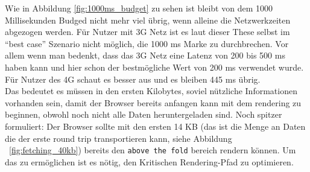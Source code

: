 		Wie in Abbildung \ref{fig:1000ms_budget} zu sehen ist bleibt von dem 1000 Millisekunden Budged nicht mehr viel übrig, wenn alleine die Netzwerkzeiten abgezogen werden. Für Nutzer mit 3G Netz ist es laut dieser These selbst im "`best case"' Szenario nicht möglich, die 1000 ms Marke zu durchbrechen. Vor allem wenn man bedenkt, dass das 3G Netz eine Latenz von 200 bis 500 ms haben kann und hier schon der bestmögliche Wert von 200 ms verwendet wurde.\\
		Für Nutzer des 4G schaut es besser aus und es bleiben 445 ms übrig.\\
		Das bedeutet es müssen in den ersten Kilobytes, soviel nützliche Informationen vorhanden sein, damit der Browser bereits anfangen kann mit dem rendering zu beginnen, obwohl noch nicht alle Daten heruntergeladen sind. Noch spitzer formuliert: Der Browser sollte mit den ersten 14 KB (das ist die Menge an Daten die der erste round trip transportieren kann, siehe Abbildung ~\ref{fig:fetching_40kb}) bereits den \texttt{above the fold} bereich rendern können. Um das zu ermöglichen ist es nötig, den Kritischen Rendering-Pfad zu optimieren.
		

